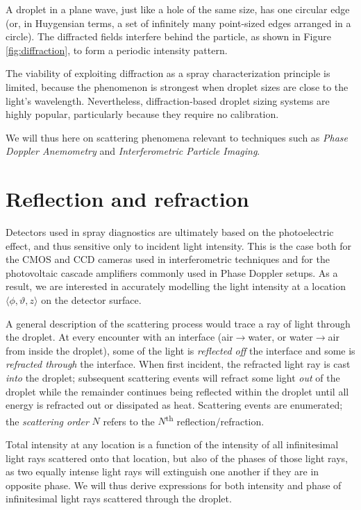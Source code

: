 \documentclass[11.5pt,oneside]{book}
\begin{document}
A droplet in a plane wave, just like a hole of the same size, has one circular
edge (or, in Huygensian terms, a set of infinitely many point-sized edges arranged in a circle). The
diffracted fields interfere behind the particle, as shown in Figure
\ref{fig:diffraction}, to form a periodic intensity pattern.

The viability of exploiting diffraction as a spray characterization principle is
limited, because the phenomenon is strongest when droplet sizes are close to the
light's wavelength. Nevertheless, diffraction-based droplet sizing systems are
highly popular, particularly because they require no calibration.

We will thus here on scattering phenomena relevant to
techniques such as \emph{Phase Doppler Anemometry} and \emph{Interferometric
Particle Imaging}.

\section{Reflection and refraction}
Detectors used in spray diagnostics are ultimately based on the photoelectric
effect, and thus sensitive only to incident light intensity. This is the case
both for the \textsc{CMOS} and \textsc{CCD} cameras used in interferometric
techniques and for the photovoltaic cascade amplifiers commonly used in Phase
Doppler setups. As a result, we are interested in accurately modelling the light
intensity at a location $\langle \phi, \vartheta, z \rangle$ on the detector
surface.

A general description of the scattering process would trace a ray of light
through the droplet. At every encounter with an interface
(air$\rightarrow$water, or water$\rightarrow$air from inside the droplet), some of
the light is \emph{reflected off} the interface and some is \emph{refracted
through} the interface. When first incident, the refracted light ray is cast
\emph{into} the droplet; subsequent scattering events will refract some light
\emph{out} of the droplet while the remainder continues being reflected within the
droplet until all energy is refracted out or dissipated as heat. Scattering events
are enumerated; the \emph{scattering order} $N$ refers to the
$N$\textsuperscript{th} reflection/refraction.

Total intensity at any location is a function of the intensity of all
infinitesimal light rays scattered onto that location, but also of the phases of
those light rays, as two equally intense light rays will extinguish one another
if they are in opposite phase. We will thus derive expressions for both
intensity and phase of infinitesimal light rays scattered through the droplet.
\end{document}
